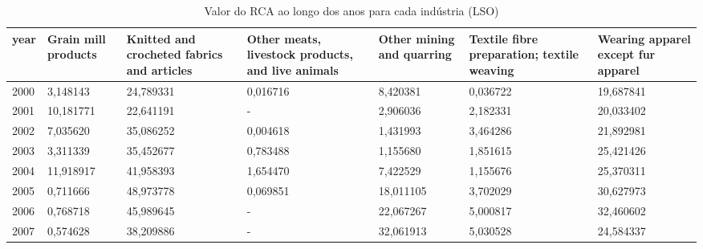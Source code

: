 \begin{table}
\centering
\caption{Valor do RCA ao longo dos anos para cada indústria (LSO)}
\begin{tabular}{p{1cm}p{2cm}p{2cm}p{2cm}p{2cm}p{2cm}p{2cm}}
\toprule
 year &  Grain mill products &  Knitted and crocheted fabrics and articles &  Other meats, livestock products, and live animals &  Other mining and quarring &  Textile fibre preparation; textile weaving &  Wearing apparel except fur apparel \\
\midrule
 2000 &             3,148143 &                                   24,789331 &                                           0,016716 &                   8,420381 &                                    0,036722 &                           19,687841 \\
 2001 &            10,181771 &                                   22,641191 &                                                  - &                   2,906036 &                                    2,182331 &                           20,033402 \\
 2002 &             7,035620 &                                   35,086252 &                                           0,004618 &                   1,431993 &                                    3,464286 &                           21,892981 \\
 2003 &             3,311339 &                                   35,452677 &                                           0,783488 &                   1,155680 &                                    1,851615 &                           25,421426 \\
 2004 &            11,918917 &                                   41,958393 &                                           1,654470 &                   7,422529 &                                    1,155676 &                           25,370311 \\
 2005 &             0,711666 &                                   48,973778 &                                           0,069851 &                  18,011105 &                                    3,702029 &                           30,627973 \\
 2006 &             0,768718 &                                   45,989645 &                                                  - &                  22,067267 &                                    5,000817 &                           32,460602 \\
 2007 &             0,574628 &                                   38,209886 &                                                  - &                  32,061913 &                                    5,030528 &                           24,584337 \\

\end{tabular}
\end{table}
